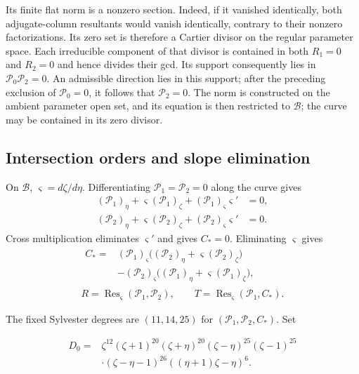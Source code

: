 \documentclass[11pt,a4paper]{article}
\numberwithin{equation}{section}
\theoremstyle{plain}
\theoremstyle{definition}
\theoremstyle{remark}
\begin{document}
Its finite flat norm is a nonzero section. Indeed, if it vanished
identically, both adjugate-column resultants would vanish identically,
contrary to their nonzero factorizations.
Its zero set is therefore a Cartier divisor on the regular parameter
space. Each irreducible component of that divisor is contained in
both $R_1=0$ and $R_2=0$ and hence divides their gcd.
Its support consequently lies in $\mathcal P_0\mathcal P_2=0$.
An admissible direction lies in this support; after the preceding
exclusion of $\mathcal P_0=0$, it follows that $\mathcal P_2=0$.
The norm is constructed on the ambient parameter open set, and its
equation is then restricted to $\mathscr B$; the curve may be contained
in its zero divisor.

\subsection{Intersection orders and slope elimination}
\label{appr3:contactcalculation}\label{appr3:contact}

\label{r3:contact}

On $\mathscr B$, $\varsigma=d\zeta/d\eta$. Differentiating
$\mathcal P_1=\mathcal P_2=0$ along the curve gives
\[
\begin{aligned}
 (\mathcal P_1)_\eta +\varsigma (\mathcal P_1)_\zeta +(\mathcal P_1)_\varsigma\varsigma '&=0,\\
 (\mathcal P_2)_\eta +\varsigma (\mathcal P_2)_\zeta +(\mathcal P_2)_\varsigma\varsigma '&=0.
\end{aligned}
\]
Cross multiplication eliminates $\varsigma '$ and gives $C_*=0$.
Eliminating $\varsigma$ gives
\begin{equation}\begin{gathered}
\begin{aligned}
C_*={}&(\mathcal P_1)_\varsigma\bigl((\mathcal P_2)_\eta+\varsigma(\mathcal P_2)_\zeta\bigr)\\
 &-(\mathcal P_2)_\varsigma\bigl((\mathcal P_1)_\eta+\varsigma(\mathcal P_1)_\zeta\bigr),
\end{aligned}\\
R=\operatorname{Res}_\varsigma (\mathcal P_1,\mathcal P_2),\qquad T=\operatorname{Res}_\varsigma (\mathcal P_1,C_*).
\end{gathered}\end{equation}

The fixed Sylvester degrees are $(11,14,25)$ for $(\mathcal P_1,\mathcal P_2,C_*)$. Set

\begin{equation}\begin{aligned}
D_0={}&\zeta ^{12}(\zeta +1)^{20}(\zeta +\eta )^{20}(\zeta -\eta )^{25}(\zeta -1)^{25}\\
 &\cdot(\zeta -\eta -1)^{26}((\eta +1)\zeta -\eta )^6.
\end{aligned}\end{equation}
\end{document}
